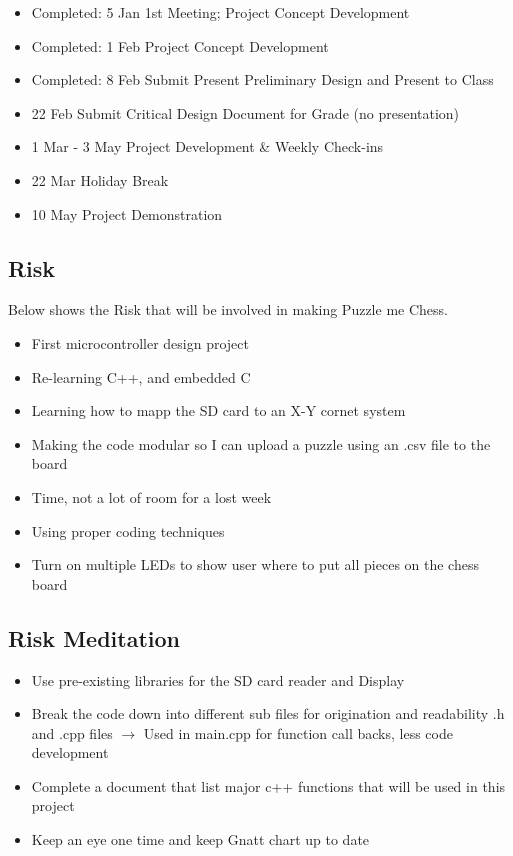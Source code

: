 \documentclass[11pt]{article}
\begin{document}
\begin{itemize}
\item Completed: 5 Jan	1st Meeting; Project Concept Development
\item Completed: 1  Feb	Project Concept Development 
\item Completed: 8 Feb	Submit Present Preliminary Design and Present to Class
\item 22 Feb	Submit Critical Design Document for Grade (no presentation)
\item 1 Mar - 3 May	Project Development \& Weekly Check-ins
\item 22 Mar	Holiday Break
\item 10 May	Project Demonstration
\end{itemize}

\subsection{Risk}
Below shows the Risk that will be involved in making Puzzle me Chess. 

\begin{itemize}
\item First microcontroller design project
\item Re-learning C++, and embedded C
\item Learning how to mapp the SD card to an X-Y cornet system
\item Making the code modular so I can upload a puzzle using an .csv file to the board
\item Time, not a lot of room for a lost week
\item Using proper coding techniques  
\item Turn on multiple LEDs to show user where to put all pieces on the chess board
\end{itemize}

\subsection{Risk Meditation}

\begin{itemize}
\item Use pre-existing libraries for the SD card reader and Display
\item Break the code down into different sub files for origination and readability
\subitem .h and .cpp files $\rightarrow$ Used in main.cpp for function call backs, less code development
\item Complete a document that list major c++ functions that will be used in this project
\item Keep an eye one time and keep Gnatt chart up to date
\end{itemize}
\end{document}
